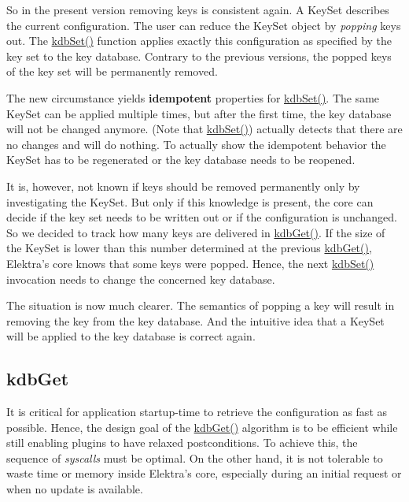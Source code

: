 So in the present version removing keys is consistent again. A {\ttfamily Key\+Set} describes the current configuration. The user can reduce the {\ttfamily Key\+Set} object by {\itshape popping} keys out. The {\ttfamily \hyperlink{group__kdb_ga11436b058408f83d303ca5e996832bcf}{kdb\+Set()}} function applies exactly this configuration as specified by the key set to the key database. Contrary to the previous versions, the popped keys of the key set will be permanently removed.

The new circumstance yields {\bfseries idempotent} properties for {\ttfamily \hyperlink{group__kdb_ga11436b058408f83d303ca5e996832bcf}{kdb\+Set()}}. The same {\ttfamily Key\+Set} can be applied multiple times, but after the first time, the key database will not be changed anymore. (Note that {\ttfamily \hyperlink{group__kdb_ga11436b058408f83d303ca5e996832bcf}{kdb\+Set()}}) actually detects that there are no changes and will do nothing. To actually show the idempotent behavior the Key\+Set has to be regenerated or the key database needs to be reopened.

It is, however, not known if keys should be removed permanently only by investigating the {\ttfamily Key\+Set}. But only if this knowledge is present, the core can decide if the key set needs to be written out or if the configuration is unchanged. So we decided to track how many keys are delivered in {\ttfamily \hyperlink{group__kdb_ga28e385fd9cb7ccfe0b2f1ed2f62453a1}{kdb\+Get()}}. If the size of the {\ttfamily Key\+Set} is lower than this number determined at the previous {\ttfamily \hyperlink{group__kdb_ga28e385fd9cb7ccfe0b2f1ed2f62453a1}{kdb\+Get()}}, Elektra’s core knows that some keys were popped. Hence, the next {\ttfamily \hyperlink{group__kdb_ga11436b058408f83d303ca5e996832bcf}{kdb\+Set()}} invocation needs to change the concerned key database.

The situation is now much clearer. The semantics of popping a key will result in removing the key from the key database. And the intuitive idea that a {\ttfamily Key\+Set} will be applied to the key database is correct again.

\subsection*{kdb\+Get}

It is critical for application startup-\/time to retrieve the configuration as fast as possible. Hence, the design goal of the {\ttfamily \hyperlink{group__kdb_ga28e385fd9cb7ccfe0b2f1ed2f62453a1}{kdb\+Get()}} algorithm is to be efficient while still enabling plugins to have relaxed postconditions. To achieve this, the sequence of {\itshape syscalls} must be optimal. On the other hand, it is not tolerable to waste time or memory inside Elektra’s core, especially during an initial request or when no update is available.

